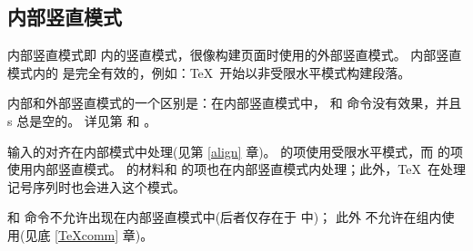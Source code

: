 \documentclass{book}
\begin{document}
\subsection{内部竖直模式}

内部竖直模式即  内的竖直模式，很像构建页面时使用的外部竖直模式。
内部竖直模式内的  是完全有效的，例如：\TeX\ 开始以非受限水平模式构建段落。

内部和外部竖直模式的一个区别是：在内部竖直模式中， 和  命令没有效果，并且 s 总是空的。
详见第 \pageref{lastbox} 和 \pageref{unskip}。

输入的对齐在内部模式中处理(见第 \ref{align} 章)。
 的项使用受限水平模式，而  的项使用内部竖直模式。
 的材料和  的项也在内部竖直模式内处理；此外，\TeX\ 在处理  记号序列时也会进入这个模式。

 和  命令不允许出现在内部竖直模式中(后者仅存在于 \IniTeX 中)；
此外  不允许在组内使用(见底 \ref{TeXcomm} 章)。

\end{document}
